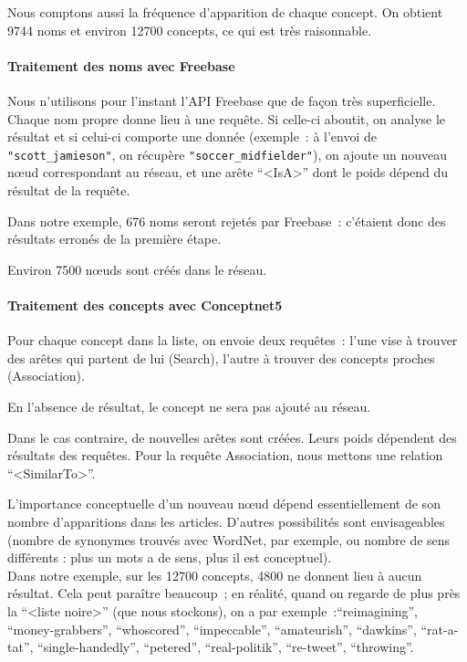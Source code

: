 \documentclass[a4paper, 12pt]{article}
\begin{document}
Nous comptons aussi la fréquence d'apparition de chaque concept. On obtient 9744 noms et environ 12700 concepts, ce qui est très raisonnable.

\paragraph{Traitement des noms avec Freebase}

Nous n'utilisons pour l'instant l'API Freebase que de fa\c{c}on très superficielle. Chaque nom propre donne lieu à une requête. Si celle-ci aboutit, on analyse le résultat et si celui-ci comporte une donnée (exemple~: à l'envoi de \verb|"scott_jamieson"|, on récupère \verb|"soccer_midfielder"|), on ajoute un nouveau nœud correspondant au réseau, et une arête ``<IsA>'' dont le poids dépend du résultat de la requête.

Dans notre exemple, 676 noms seront rejetés par Freebase~: c'étaient donc des résultats erronés de la première étape.

Environ 7500 nœuds sont créés dans le réseau.

\paragraph{Traitement des concepts avec Conceptnet5}

Pour chaque concept dans la liste, on envoie deux requêtes~: l'une vise à trouver des arêtes qui partent de lui (Search), l'autre à trouver des concepts proches (Association).

En l'absence de résultat, le concept ne sera pas ajouté au réseau.

Dans le cas contraire, de nouvelles arêtes sont créées. Leurs poids dépendent des résultats des requêtes. Pour la requête Association, nous mettons une relation ``<SimilarTo>''.

L'importance conceptuelle d'un nouveau nœud dépend essentiellement de son nombre d'apparitions dans les articles. D'autres possibilités sont envisageables (nombre de synonymes trouvés avec WordNet, par exemple, ou nombre de sens différents : plus un mots a de sens, plus il est conceptuel).\\

Dans notre exemple, sur les 12700 concepts, 4800 ne donnent lieu à aucun résultat. Cela peut paraître beaucoup~; en réalité, quand on regarde de plus près la ``<liste noire>'' (que nous stockons), on a par exemple~:``reimagining'', ``money-grabbers'', ``whoscored'', ``impeccable'', ``amateurish'', ``dawkins'', ``rat-a-tat'', ``single-handedly'', ``petered'', ``real-politik'', ``re-tweet'', ``throwing''.
\end{document}
